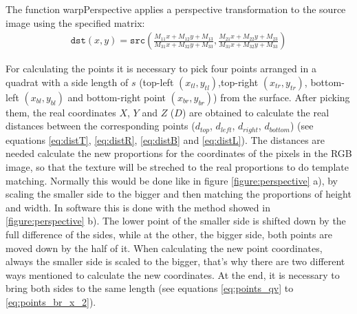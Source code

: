 The function warpPerspective applies a perspective transformation to the source image using the specified matrix:
\begin{gather}
\texttt{dst} (x,y) = \texttt{src} \left ( \frac{M_{11} x + M_{12} y + M_{13}}{M_{31} x + M_{32} y + M_{33}} , \frac{M_{21} x + M_{22} y + M_{23}}{M_{31} x + M_{32} y + M_{33}} \right ) 
\end{gather}
\cite{willowgarage:opencv:warpPerspective}

For calculating the points it is necessary to pick four points arranged in a quadrat with a side length of $s$
(top-left $(x_{tl},y_{tl})$,top-right $(x_{tr},y_{tr})$, bottom-left $(x_{bl},y_{bl})$  and bottom-right point $(x_{br},y_{br})$) 
from the surface. 
After picking them, the real coordinates $X$, $Y$ and $Z$ ($D$) are obtained to calculate 
the real distances between the corresponding points ($d_{top}$, $d_{left}$, $d_{right}$, $d_{bottom}$)
(see equations \ref{eq:distT}, \ref{eq:distR}, \ref{eq:distB} and \vref{eq:distL}).
The distances are needed calculate the new proportions for the coordinates of the pixels in the RGB image, so that
the texture will be streched to the real proportions to do template matching. Normally this would be done like in
figure \vref{figure:perspective} a), by scaling the smaller side to the bigger and then matching the proportions
of height and width. In software this is done with the method showed in \vref{figure:perspective} b). 
The lower point of the smaller side is shifted down by the full difference of the sides, while at the other, 
the bigger side, both points are moved down by the half of it. When calculating the new point coordinates,
always the smaller side is scaled to the bigger, that's why there are two different ways mentioned to 
calculate the new coordinates. At the end, it is necessary to bring both sides to the same length
(see equations \ref{eq:points_qv} to \vref{eq:points_br_x_2}).



